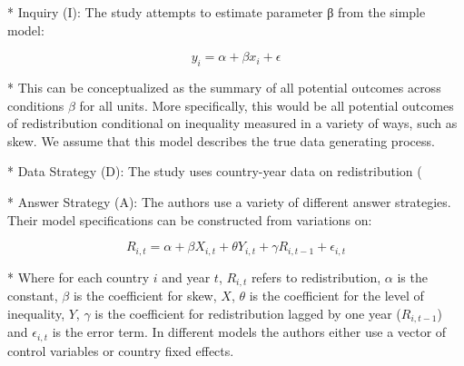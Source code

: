 \documentclass{beamer}
\begin{document}
\begin{frame}
\begin{itemize}
\begin{frame}
* Inquiry (I): The study attempts to estimate parameter β from the simple model:

$$
y_i = \alpha + \beta x_i + \epsilon
$$

* This can be conceptualized as the summary of all potential outcomes across conditions $\beta$ for all units. More specifically, this would be all potential outcomes of redistribution conditional on inequality measured in a variety of ways, such as skew. We assume that this model describes the true data generating process.

* Data Strategy (D): The study uses country-year data on redistribution (%

* Answer Strategy (A): The authors use a variety of different answer strategies. Their model specifications can be constructed from variations on:

$$
R_{i,t} = \alpha + \beta X_{i,t} + \theta Y_{i,t} + \gamma R_{i, t-1} + \epsilon_{i,t}
$$

* Where for each country $i$ and year $t$, $R_{i,t}$ refers to redistribution, $\alpha$ is the constant, $\beta$ is the coefficient for skew, $X$, $\theta$ is the coefficient for the level of inequality, $Y$, $\gamma$ is the coefficient for redistribution lagged by one year ($R_{i,t-1}$) and $\epsilon_{i,t}$ is the error term. In different models the authors either use a vector of control variables or country fixed effects.

\end{frame}




\end{itemize}
\end{frame}
\end{document}
